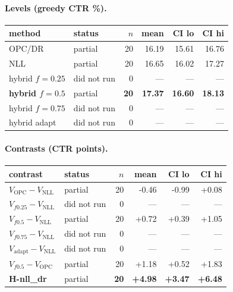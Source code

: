 \documentclass[10pt,a4paper]{article}
\begin{document}
\paragraph{Levels (greedy CTR \%).}
{\centering\small\begin{tabular}{llrrrr}
\toprule method & status & $n$ & mean & CI lo & CI hi \\
\midrule
OPC/DR & partial & 20 & 16.19 & 15.61 & 16.76 \\
NLL & partial & 20 & 16.65 & 16.02 & 17.27 \\
hybrid $f{=}0.25$ & did not run & 0 & --- & --- & --- \\
\textbf{hybrid $f{=}0.5$} & partial & \textbf{20} & \textbf{17.37} & \textbf{16.60} & \textbf{18.13} \\
hybrid $f{=}0.75$ & did not run & 0 & --- & --- & --- \\
hybrid adapt & did not run & 0 & --- & --- & --- \\
\bottomrule\end{tabular}\par}
\paragraph{Contrasts (CTR points).}
{\centering\small\begin{tabular}{llrrrr}
\toprule contrast & status & $n$ & mean & CI lo & CI hi \\
\midrule
$V_{\mathrm{OPC}}-V_{\mathrm{NLL}}$ & partial & 20 & -0.46 & -0.99 & +0.08 \\
$V_{f0.25}-V_{\mathrm{NLL}}$ & did not run & 0 & --- & --- & --- \\
$V_{f0.5}-V_{\mathrm{NLL}}$ & partial & 20 & +0.72 & +0.39 & +1.05 \\
$V_{f0.75}-V_{\mathrm{NLL}}$ & did not run & 0 & --- & --- & --- \\
$V_{\mathrm{adapt}}-V_{\mathrm{NLL}}$ & did not run & 0 & --- & --- & --- \\
$V_{f0.5}-V_{\mathrm{OPC}}$ & partial & 20 & +1.18 & +0.52 & +1.83 \\
\textbf{H-nll\_dr} & partial & \textbf{20} & \textbf{+4.98} & \textbf{+3.47} & \textbf{+6.48} \\
\bottomrule\end{tabular}\par}
\end{document}
